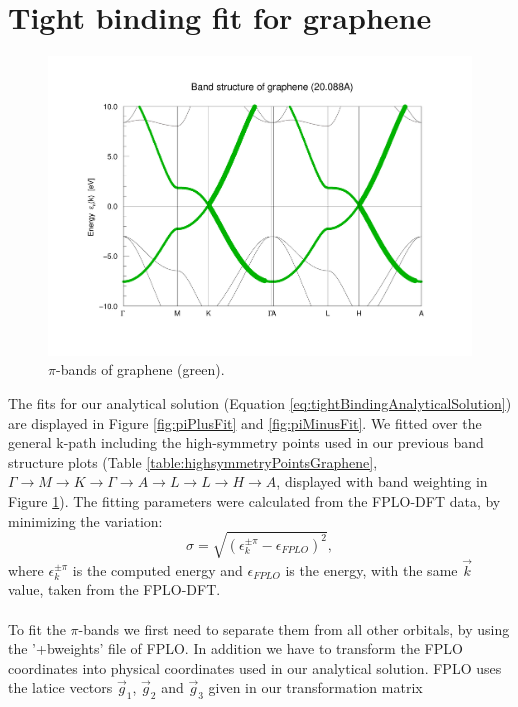 	\section{Tight binding fit for graphene}
		\begin{figure}[h]
			\centering
			\includegraphics[width=1\textwidth]{figures/TightBinding/tightBindingPiGraphene.pdf}
			\caption{$\pi$-bands of graphene (green).}
			\label{fig:graphenePiBands}
		\end{figure}
		The fits for our analytical solution (Equation \ref{eq:tightBindingAnalyticalSolution}) are displayed in Figure \ref{fig:piPlusFit} and \ref{fig:piMinusFit}. We fitted over the general k-path including the high-symmetry points used in our previous band structure plots (Table \ref{table:highsymmetryPointsGraphene}, $\Gamma \rightarrow M \rightarrow K \rightarrow \Gamma \rightarrow A \rightarrow L \rightarrow L \rightarrow H \rightarrow A$, displayed with band weighting in Figure \ref{fig:graphenePiBands}). The fitting parameters were calculated from the FPLO-DFT data, by minimizing the variation:
		\begin{equation}
			\sigma = \sqrt{\left( \epsilon_{k}^{\pm \pi} - \epsilon_{FPLO} \right)^2},
		\end{equation}
		where $\epsilon_{k}^{\pm \pi}$ is the computed energy and $\epsilon_{FPLO}$ is the energy, with the same $\vec k$ value, taken from the FPLO-DFT. \\\\
		To fit the $\pi$-bands we first need to separate them from all other orbitals, by using the '+bweights' file of FPLO. In addition we have to transform the FPLO coordinates into physical coordinates used in our analytical solution. FPLO uses the latice vectors $\vec g_1$, $\vec g_2$ and $\vec g_3$ given in our transformation matrix
